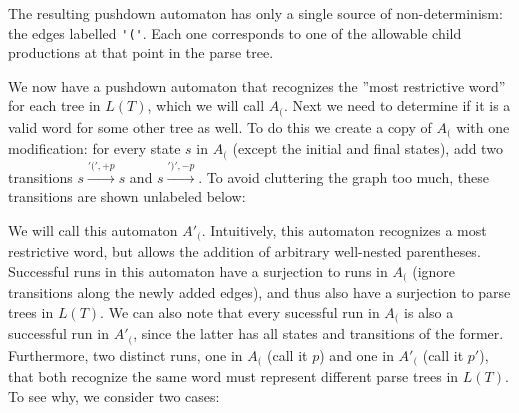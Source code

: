 \documentclass[sigplan]{acmart}\settopmatter{printfolios=true,printccs=false,printacmref=false}
\begin{document}
\noindent The resulting pushdown automaton has only a single source of non-determinism: the edges labelled \verb|'('|. Each one corresponds to one of the allowable child productions at that point in the parse tree.

We now have a pushdown automaton that recognizes the ''most restrictive word'' for each tree in $L(T)$, which we will call $A_($. Next we need to determine if it is a valid word for some other tree as well. To do this we create a copy of $A_($ with one modification: for every state $s$ in $A_($ (except the initial and final states), add two transitions $s \xrightarrow{'(', +p} s$ and $s \xrightarrow{')', -p}$. To avoid cluttering the graph too much, these transitions are shown unlabeled below:

\begin{center}
\end{center}

We will call this automaton $A'_($. Intuitively, this automaton recognizes a most restrictive word, but allows the addition of arbitrary well-nested parentheses. Successful runs in this automaton have a surjection to runs in $A_($ (ignore transitions along the newly added edges), and thus also have a surjection to parse trees in $L(T)$. We can also note that every sucessful run in $A_($ is also a successful run in $A'_($, since the latter has all states and transitions of the former. Furthermore, two distinct runs, one in $A_($ (call it $p$) and one in $A'_($ (call it $p'$), that both recognize the same word must represent different parse trees in $L(T)$. To see why, we consider two cases:
\end{document}
